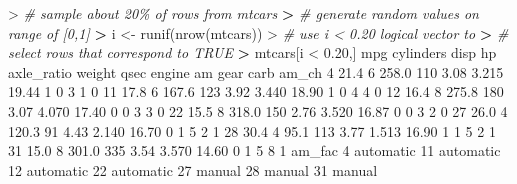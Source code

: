 \documentclass[
]{book}
\newenvironment{Shaded}{\begin{snugshade}}{\end{snugshade}}
\newcommand{\CommentTok}[1]{\textcolor[rgb]{0.56,0.35,0.01}{\textit{#1}}}
\newcommand{\DecValTok}[1]{\textcolor[rgb]{0.00,0.00,0.81}{#1}}
\newcommand{\ErrorTok}[1]{\textcolor[rgb]{0.64,0.00,0.00}{\textbf{#1}}}
\newcommand{\FloatTok}[1]{\textcolor[rgb]{0.00,0.00,0.81}{#1}}
\newcommand{\FunctionTok}[1]{\textcolor[rgb]{0.00,0.00,0.00}{#1}}
\newcommand{\NormalTok}[1]{#1}
\newcommand{\OtherTok}[1]{\textcolor[rgb]{0.56,0.35,0.01}{#1}}
\newcommand{\SpecialCharTok}[1]{\textcolor[rgb]{0.00,0.00,0.00}{#1}}
\begin{document}
\begin{Shaded}
\begin{Highlighting}[]
\SpecialCharTok{\textgreater{}} \CommentTok{\# sample about 20\% of rows from mtcars}
\ErrorTok{\textgreater{}} \CommentTok{\# generate random values on range of [0,1]}
\ErrorTok{\textgreater{}}\NormalTok{ i }\OtherTok{\textless{}{-}} \FunctionTok{runif}\NormalTok{(}\FunctionTok{nrow}\NormalTok{(mtcars))}
\SpecialCharTok{\textgreater{}} \CommentTok{\# use i \textless{} 0.20 logical vector to }
\ErrorTok{\textgreater{}} \CommentTok{\# select rows that correspond to TRUE}
\ErrorTok{\textgreater{}}\NormalTok{ mtcars[i }\SpecialCharTok{\textless{}} \FloatTok{0.20}\NormalTok{,]}
\NormalTok{    mpg cylinders  disp  hp axle\_ratio weight  qsec engine am gear carb am\_ch}
\DecValTok{4}  \FloatTok{21.4}         \DecValTok{6} \FloatTok{258.0} \DecValTok{110}       \FloatTok{3.08}  \FloatTok{3.215} \FloatTok{19.44}      \DecValTok{1}  \DecValTok{0}    \DecValTok{3}    \DecValTok{1}     \DecValTok{0}
\DecValTok{11} \FloatTok{17.8}         \DecValTok{6} \FloatTok{167.6} \DecValTok{123}       \FloatTok{3.92}  \FloatTok{3.440} \FloatTok{18.90}      \DecValTok{1}  \DecValTok{0}    \DecValTok{4}    \DecValTok{4}     \DecValTok{0}
\DecValTok{12} \FloatTok{16.4}         \DecValTok{8} \FloatTok{275.8} \DecValTok{180}       \FloatTok{3.07}  \FloatTok{4.070} \FloatTok{17.40}      \DecValTok{0}  \DecValTok{0}    \DecValTok{3}    \DecValTok{3}     \DecValTok{0}
\DecValTok{22} \FloatTok{15.5}         \DecValTok{8} \FloatTok{318.0} \DecValTok{150}       \FloatTok{2.76}  \FloatTok{3.520} \FloatTok{16.87}      \DecValTok{0}  \DecValTok{0}    \DecValTok{3}    \DecValTok{2}     \DecValTok{0}
\DecValTok{27} \FloatTok{26.0}         \DecValTok{4} \FloatTok{120.3}  \DecValTok{91}       \FloatTok{4.43}  \FloatTok{2.140} \FloatTok{16.70}      \DecValTok{0}  \DecValTok{1}    \DecValTok{5}    \DecValTok{2}     \DecValTok{1}
\DecValTok{28} \FloatTok{30.4}         \DecValTok{4}  \FloatTok{95.1} \DecValTok{113}       \FloatTok{3.77}  \FloatTok{1.513} \FloatTok{16.90}      \DecValTok{1}  \DecValTok{1}    \DecValTok{5}    \DecValTok{2}     \DecValTok{1}
\DecValTok{31} \FloatTok{15.0}         \DecValTok{8} \FloatTok{301.0} \DecValTok{335}       \FloatTok{3.54}  \FloatTok{3.570} \FloatTok{14.60}      \DecValTok{0}  \DecValTok{1}    \DecValTok{5}    \DecValTok{8}     \DecValTok{1}
\NormalTok{      am\_fac}
\DecValTok{4}\NormalTok{  automatic}
\DecValTok{11}\NormalTok{ automatic}
\DecValTok{12}\NormalTok{ automatic}
\DecValTok{22}\NormalTok{ automatic}
\DecValTok{27}\NormalTok{    manual}
\DecValTok{28}\NormalTok{    manual}
\DecValTok{31}\NormalTok{    manual}
\end{Highlighting}
\end{Shaded}
\end{document}
